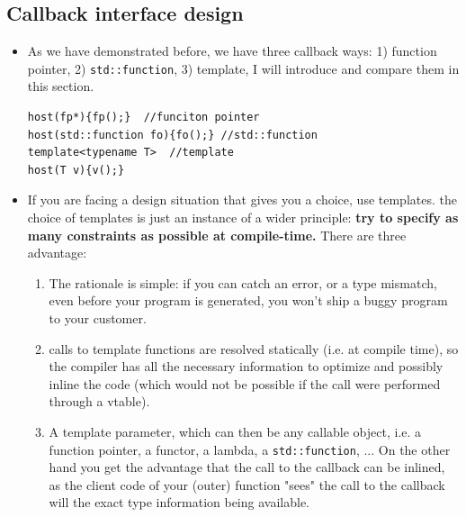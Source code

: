 \documentclass[a4paper,11pt,twoside]{book}
\begin{document}




\subsection{Callback interface design}
\begin{itemize}
	\item As we have demonstrated before, we have three callback ways: 
	1) function pointer, 
	2) \texttt{std::function},
	3) template,
I will introduce and compare them in this section.
	
\begin{lstlisting} 
host(fp*){fp();}  //funciton pointer
host(std::function fo){fo();} //std::function
template<typename T>  //template
host(T v){v();}
\end{lstlisting}
	
	\item If you are facing a design situation that gives you a choice, use templates. the choice of templates is just an instance of a wider principle: \textbf{try to specify as many constraints as possible at compile-time.} There are three advantage:
	\begin{enumerate}
		\item The rationale is simple: if you can catch an error, or a type mismatch, even before your program is generated, you won't ship a buggy program to your customer.
		
		\item calls to template functions are resolved statically (i.e. at compile time), so the compiler has all the necessary information to optimize and possibly inline the code (which would not be possible if the call were performed through a vtable).
		
		\item A template parameter, which can then be any callable object, i.e. a function pointer, a functor, a lambda, a \texttt{std::function}, ...  On the other hand you get the advantage that the call to the callback can be inlined, as the client code of your (outer) function "sees" the call to the callback will the exact type information being available.
	\end{enumerate}


\end{itemize}
\end{document}
